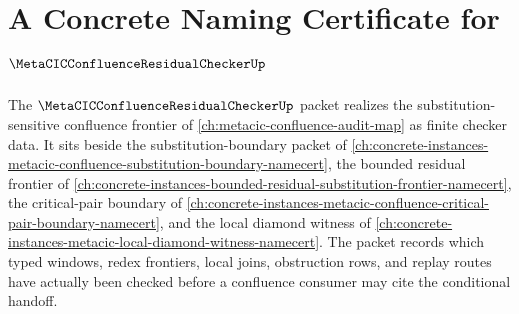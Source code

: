 \chapter{A Concrete Naming Certificate for $\MetaCICConfluenceResidualCheckerUp$}
\label{ch:concrete-instances-metacic-confluence-residual-checker-namecert}

The $\MetaCICConfluenceResidualCheckerUp$ packet realizes the substitution-sensitive confluence frontier of \autoref{ch:metacic-confluence-audit-map} as finite checker data. It sits beside the substitution-boundary packet of \autoref{ch:concrete-instances-metacic-confluence-substitution-boundary-namecert}, the bounded residual frontier of \autoref{ch:concrete-instances-bounded-residual-substitution-frontier-namecert}, the critical-pair boundary of \autoref{ch:concrete-instances-metacic-confluence-critical-pair-boundary-namecert}, and the local diamond witness of \autoref{ch:concrete-instances-metacic-local-diamond-witness-namecert}. The packet records which typed windows, redex frontiers, local joins, obstruction rows, and replay routes have actually been checked before a confluence consumer may cite the conditional handoff.



